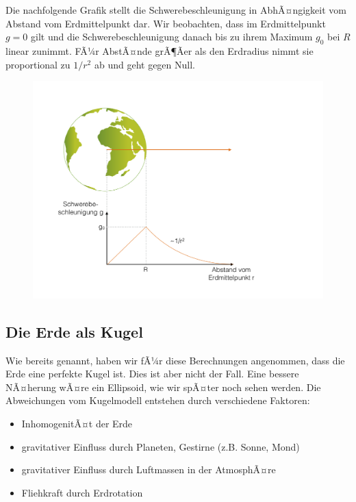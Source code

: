 Die nachfolgende Grafik stellt die Schwerebeschleunigung in AbhÃ¤ngigkeit vom Abstand vom Erdmittelpunkt dar. Wir beobachten, dass im Erdmittelpunkt \mbox{$g=0$} gilt und die Schwerebeschleunigung danach bis zu ihrem Maximum $g_0$ bei $R$ linear zunimmt. FÃ¼r AbstÃ¤nde grÃ¶Ãer als den Erdradius nimmt sie proportional zu $1/r^2$ ab und geht gegen Null. 

\begin{figure}[H]
\centering
  \includegraphics[width = \textwidth]{GravimetrieBilder/Abnahme_Grav}
\end{figure}


\subsection*{Die Erde als Kugel}

Wie bereits genannt, haben wir fÃ¼r diese Berechnungen angenommen, dass die Erde eine perfekte Kugel ist. Dies ist aber nicht der Fall. Eine bessere NÃ¤herung wÃ¤re ein Ellipsoid, wie wir spÃ¤ter noch sehen werden. Die Abweichungen vom Kugelmodell entstehen durch verschiedene Faktoren: 
\begin{itemize}
	\item InhomogenitÃ¤t der Erde
	\item gravitativer Einfluss durch Planeten, Gestirne (z.B. Sonne, Mond)
	\item gravitativer Einfluss durch Luftmassen in der AtmosphÃ¤re
	\item Fliehkraft durch Erdrotation
\end{itemize} 


